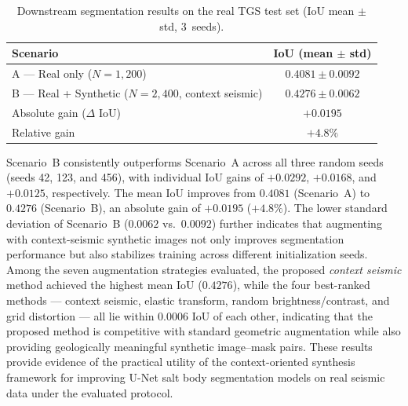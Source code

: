 \documentclass{ieeeaccess}
\begin{document}
\begin{table}[htbp]
    \centering
    \caption{Downstream segmentation results on the real TGS test set (IoU mean $\pm$ std, 3~seeds).}
    \label{tab:downstream}
    \begin{tabular}{lc}
        \toprule
        \textbf{Scenario} & \textbf{IoU (mean $\pm$ std)} \\
        \midrule
        A --- Real only ($N{=}1{,}200$)                        & $0.4081 \pm 0.0092$ \\
        B --- Real + Synthetic ($N{=}2{,}400$, context seismic) & $\mathbf{0.4276 \pm 0.0062}$ \\
        \midrule
        Absolute gain ($\Delta$ IoU)                           & $+0.0195$ \\
        Relative gain                                          & $+4.8\%$ \\
        \bottomrule
    \end{tabular}
\end{table}

Scenario~B consistently outperforms Scenario~A across all three random seeds (seeds 42, 123, and 456), with individual IoU gains of $+0.0292$, $+0.0168$, and $+0.0125$, respectively. The mean IoU improves from $0.4081$ (Scenario~A) to $0.4276$ (Scenario~B), an absolute gain of $+0.0195$ ($+4.8\%$). The lower standard deviation of Scenario~B ($0.0062$ vs.\ $0.0092$) further indicates that augmenting with context-seismic synthetic images not only improves segmentation performance but also stabilizes training across different initialization seeds. Among the seven augmentation strategies evaluated, the proposed \emph{context seismic} method achieved the highest mean IoU ($0.4276$), while the four best-ranked methods — context seismic, elastic transform, random brightness/contrast, and grid distortion — all lie within $0.0006$ IoU of each other, indicating that the proposed method is competitive with standard geometric augmentation while also providing geologically meaningful synthetic image--mask pairs. These results provide evidence of the practical utility of the context-oriented synthesis framework for improving U-Net salt body segmentation models on real seismic data under the evaluated protocol.
\end{document}
